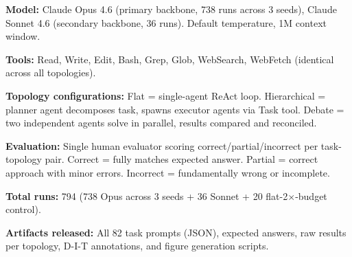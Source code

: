 \textbf{Model:} Claude Opus 4.6 (primary backbone, 738 runs across 3 seeds), Claude Sonnet 4.6 (secondary backbone, 36 runs). Default temperature, 1M context window.

\textbf{Tools:} Read, Write, Edit, Bash, Grep, Glob, WebSearch, WebFetch (identical across all topologies).

\textbf{Topology configurations:} Flat = single-agent ReAct loop. Hierarchical = planner agent decomposes task, spawns executor agents via Task tool. Debate = two independent agents solve in parallel, results compared and reconciled.

\textbf{Evaluation:} Single human evaluator scoring correct/partial/incorrect per task-topology pair. Correct = fully matches expected answer. Partial = correct approach with minor errors. Incorrect = fundamentally wrong or incomplete.

\textbf{Total runs:} 794 (738 Opus across 3 seeds + 36 Sonnet + 20 flat-2$\times$-budget control).

\textbf{Artifacts released:} All 82 task prompts (JSON), expected answers, raw results per topology, D-I-T annotations, and figure generation scripts.
